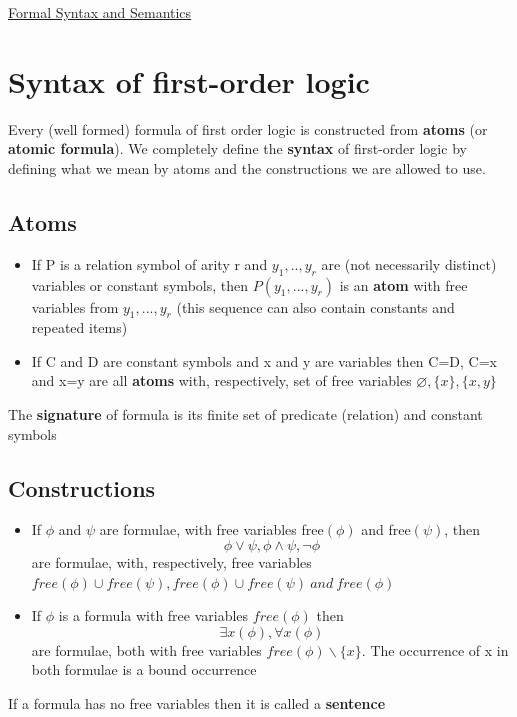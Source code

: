 \documentclass{article}[18pt]
\begin{document}
\begin{center}
\underline{\huge Formal Syntax and Semantics}
\end{center}
\section{Syntax of first-order logic}
Every (well formed) formula of first order logic is constructed from \textbf{atoms} (or \textbf{atomic formula}). We completely define the \textbf{syntax} of first-order logic by defining what we mean by atoms and the constructions we are allowed to use.
\subsection{Atoms}
\begin{itemize}
\item If P is a relation symbol of arity r and $y_1,..,y_r$ are (not necessarily distinct) variables or constant symbols, then $P(y_1,...,y_r)$ is an \textbf{atom} with free variables from $y_1,...,y_r$ (this sequence can also contain constants and repeated items)
\item If C and D are constant symbols and x and y are variables then C=D, C=x and x=y are all \textbf{atoms} with, respectively, set of free variables $\varnothing, \{x\}, \{x,y\}$
\end{itemize}
The \textbf{signature} of formula is its finite set of predicate (relation) and constant symbols
\subsection{Constructions}
\begin{itemize}
\item If $\phi$ and $\psi$ are formulae, with free variables free$(\phi)$ and free$(\psi)$, then
$$\phi \vee \psi , \phi \wedge \psi , \neg \phi$$
are formulae, with, respectively, free variables $free(\phi)\cup free(\psi), free (\phi)\cup free(\psi) \ and \ free(\phi)$
\item If $\phi$ is a formula with free variables $free(\phi)$ then
$$\exists x ( \phi ) , \forall x ( \phi )$$
are formulae, both with free variables $free(\phi) \backslash \{x\}$. The occurrence of x in both formulae is a bound occurrence 
\end{itemize}
If a formula has no free variables then it is called a \textbf{sentence}
\end{document}
